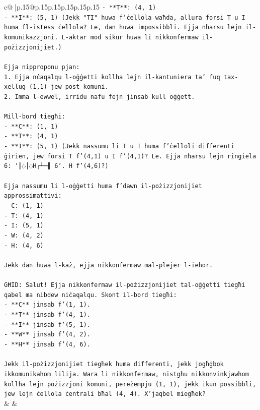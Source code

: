 \documentclass{article}
\begin{document}
{\begin{supertabular}{c@{$\;$}|p{.15\linewidth}@{}p{.15\linewidth}p{.15\linewidth}p{.15\linewidth}p{.15\linewidth}p{.15\linewidth}}
{{{\texttt{{-} **T**: (4, 1)} \\
\texttt{{-} **I**: (5, 1) (Jekk "TI" huwa f'ċellola waħda, allura forsi T u I huma fl{-}istess ċellola? Le, dan huwa impossibbli. Ejja nħarsu lejn il{-}komunikazzjoni. L{-}aktar mod sikur huwa li nikkonfermaw il{-}pożizzjonijiet.)} \\
\\ 
\texttt{Ejja nipproponu pjan:} \\
\texttt{1. Ejja nċaqalqu l{-}oġġetti kollha lejn il{-}kantuniera ta' fuq tax{-}xellug (1,1) jew post komuni.} \\
\texttt{2. Imma l{-}ewwel, irridu nafu fejn jinsab kull oġġett.} \\
\\ 
\texttt{Mill{-}bord tiegħi:} \\
\texttt{{-} **C**: (1, 1)} \\
\texttt{{-} **T**: (4, 1)} \\
\texttt{{-} **I**: (5, 1) (Jekk nassumu li T u I huma f'ċelloli differenti ġirien, jew forsi T f'(4,1) u I f'(4,1)? Le. Ejja nħarsu lejn ringiela 6: `║◌│◌H┌┴─╢ 6`. H f'(4,6)?)} \\
\\ 
\texttt{Ejja nassumu li l{-}oġġetti huma f'dawn il{-}pożizzjonijiet approssimattivi:} \\
\texttt{{-} C: (1, 1)} \\
\texttt{{-} T: (4, 1)} \\
\texttt{{-} I: (5, 1)} \\
\texttt{{-} W: (4, 2)} \\
\texttt{{-} H: (4, 6)} \\
\\ 
\texttt{Jekk dan huwa l{-}każ, ejja nikkonfermaw mal{-}plejer l{-}ieħor.} \\
\\ 
\texttt{GĦID: Salut! Ejja nikkonfermaw il{-}pożizzjonijiet tal{-}oġġetti tiegħi qabel ma nibdew niċaqalqu. Skont il{-}bord tiegħi:} \\
\texttt{{-} **C** jinsab f'(1, 1).} \\
\texttt{{-} **T** jinsab f'(4, 1).} \\
\texttt{{-} **I** jinsab f'(5, 1).} \\
\texttt{{-} **W** jinsab f'(4, 2).} \\
\texttt{{-} **H** jinsab f'(4, 6).} \\
\\ 
\texttt{Jekk il{-}pożizzjonijiet tiegħek huma differenti, jekk jogħġbok ikkomunikahom lilija. Wara li nikkonfermaw, nistgħu nikkonvinkjawhom kollha lejn pożizzjoni komuni, pereżempju (1, 1), jekk ikun possibbli, jew lejn ċellola ċentrali bħal (4, 4). X'jaqbel miegħek?} \\
            }
        }
    }
    & & \\ \\


\end{supertabular}}
\end{document}
